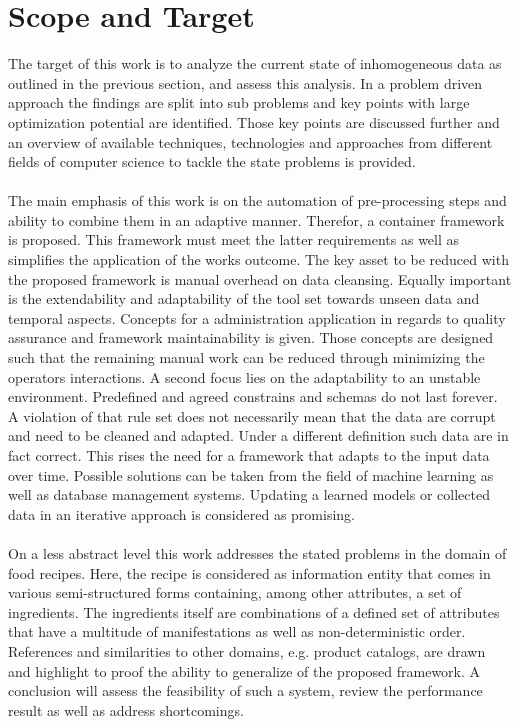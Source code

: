 \section{Scope and Target\label{sec:scope}}
The target of this work is to analyze the current state of inhomogeneous data as outlined in the previous section, and assess this analysis. In a problem driven approach the findings are split into sub problems and key points with large optimization potential are identified. Those key points are discussed further and an overview of available techniques, technologies and approaches from different fields of computer science to tackle the state problems is provided.
\\\\
The main emphasis of this work is on the automation of pre-processing steps and ability to combine them in an adaptive manner. Therefor, a container framework is proposed. This framework must meet the latter requirements as well as simplifies the application of the works outcome. The key asset to be reduced with the proposed framework is manual overhead on data cleansing. Equally important is the extendability and adaptability of the tool set towards unseen data and temporal aspects. Concepts for a administration application in regards to quality assurance and framework maintainability is given. Those concepts are designed such that the remaining manual work can be reduced through minimizing the operators interactions. 
A second focus lies on the adaptability to an unstable environment. Predefined and agreed constrains and schemas do not last forever. A violation of that rule set does not necessarily mean that the data are corrupt and need to be cleaned and adapted. Under a different definition such data are in fact correct. This rises the need for a framework that adapts to the input data over time. Possible solutions can be taken from the field of machine learning as well as database management systems. Updating a learned models or collected data in an iterative approach is considered as promising. 
\\\\
On a less abstract level this work addresses the stated problems in the domain of food recipes. Here, the recipe is considered as information entity that comes in various semi-structured forms containing, among other attributes, a set of ingredients. The ingredients itself are combinations of a defined set of attributes that have a multitude of manifestations as well as non-deterministic order. References and similarities to other domains, e.g. product catalogs, are drawn and highlight to proof the ability to generalize of the proposed framework. A conclusion will assess the feasibility of such a system, review the performance result as well as address shortcomings.
